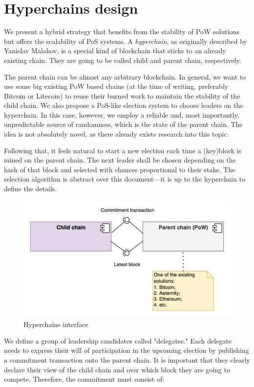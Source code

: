 \section{Hyperchains design}
\graphicspath{ {./images/} }

We present a hybrid strategy that benefits from the stability of PoW solutions
but offers the scalability of PoS systems. A \emph{hyperchain}, as originally
described by Yanislav Malahov\cite{hyperchains}, is a special kind of blockchain
that sticks to an already existing chain. They are going to be called child and
parent chain, respectively.

The parent chain can be almost any arbitrary blockchain. In general, we want to
use some big existing PoW based chains (at the time of writing, preferably
Bitcoin or Litecoin) to reuse their burned work to maintain the stability of the
child chain. We also propose a PoS-like election system to choose leaders on the
hyperchain. In this case, however, we employ a reliable and, most importantly,
unpredictable source of randomness, which is the state of the parent chain. The
idea is not absolutely novel, as there already exists research into this
topic\cite{blockchain_random}.

Following that, it feels natural to start a new election each time a (key)block
is mined on the parent chain. The next leader shall be chosen depending on the
hash of that block and selected with chances proportional to their stake. The
selection algorithm is abstract over this document---it is up to the hyperchain
to define the details.

\begin{figure}[b]
     \caption{Hyperchains interface}
     \centering
     \includegraphics[scale=0.5]{hyperchains_interface}
\end{figure}

We define a group of leadership candidates called "delegates." Each delegate
needs to express their will of participation in the upcoming election by
publishing a commitment transaction onto the parent chain. It is important that
they clearly declare their view of the child chain and over which block they are
going to compete. Therefore, the commitment must consist of:

